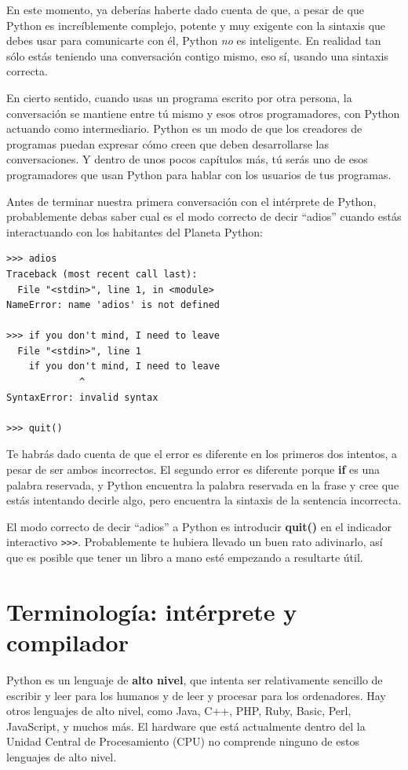 En este momento, ya deberías haberte dado cuenta de que, a pesar de que Python
es increíblemente complejo, potente y muy exigente con
la sintaxis que debes usar para comunicarte con él, Python {\em no} es
inteligente. En realidad tan sólo estás teniendo una conversación
contigo mismo, eso sí, usando una sintaxis correcta.

En cierto sentido, cuando usas un programa escrito por otra persona,
la conversación se mantiene entre tú mismo y esos otros programadores,
con Python actuando como intermediario. Python es un
modo de que los creadores de programas puedan expresar cómo creen
que deben desarrollarse las conversaciones. Y dentro
de unos pocos capítulos más, tú serás uno de esos programadores
que usan Python para hablar con los usuarios de tus programas.

Antes de terminar nuestra primera conversación con el intérprete
de Python, probablemente debas saber cual es el modo correcto
de decir ``adios'' cuando estás interactuando con los
habitantes del Planeta Python:

\beforeverb
\begin{verbatim}
>>> adios
Traceback (most recent call last):
  File "<stdin>", line 1, in <module>
NameError: name 'adios' is not defined

>>> if you don't mind, I need to leave
  File "<stdin>", line 1
    if you don't mind, I need to leave
             ^
SyntaxError: invalid syntax

>>> quit()
\end{verbatim}
\afterverb
%
Te habrás dado cuenta de que el error es diferente en los primeros
dos intentos, a pesar de ser ambos incorrectos. El segundo error es diferente porque
{\bf if} es una palabra reservada, y Python encuentra la palabra
reservada en la frase y cree que estás intentando decirle algo, pero encuentra
la sintaxis de la sentencia incorrecta.

El modo correcto de decir ``adios'' a Python es introducir
{\bf quit()} en el indicador interactivo {\tt >>>}.
Probablemente te hubiera llevado un buen rato adivinarlo,
así que es posible que tener un libro a mano
esté empezando a resultarte útil.

\section{Terminología: intérprete y compilador}

Python es un lenguaje de {\bf alto nivel}, que intenta ser relativamente
sencillo de escribir y leer para los humanos y de leer y procesar para
los ordenadores. Hay otros lenguajes de alto nivel, como Java, C++,
PHP, Ruby, Basic, Perl, JavaScript, y muchos más. El hardware que está
actualmente dentro del la Unidad Central de Procesamiento (CPU) no comprende
ninguno de estos lenguajes de alto nivel.

